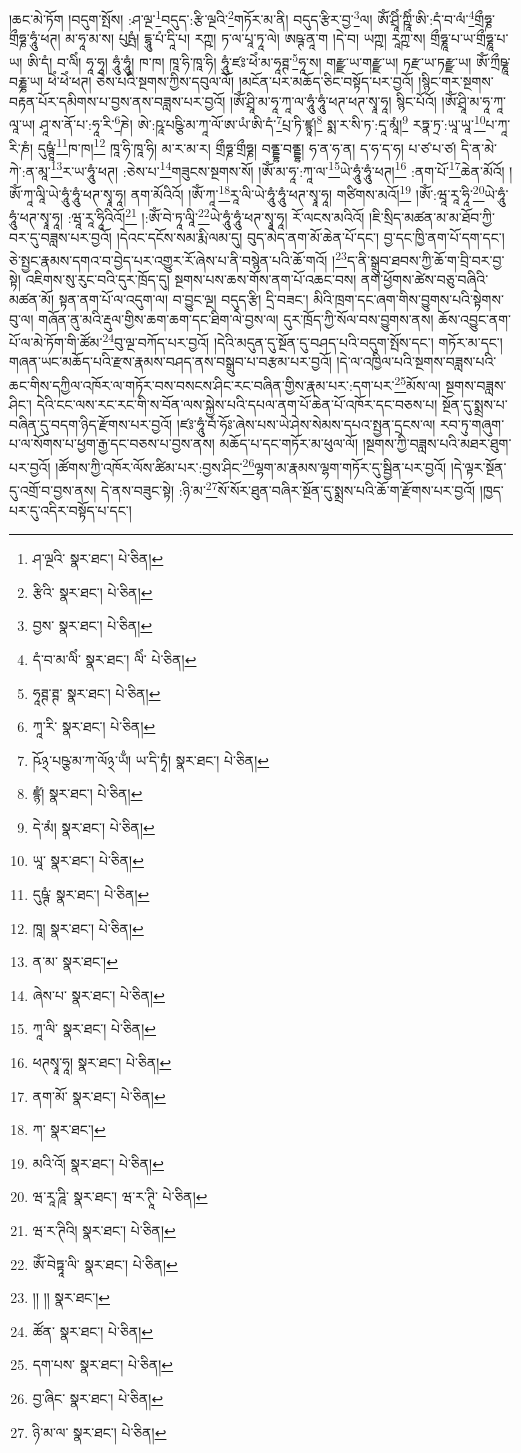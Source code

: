 །ཆང་མེ་ཏོག །བདུག་སྤོས། :ཤ་ལྔ་\footnote{ཤ་ལྔའི་  སྣར་ཐང་།  པེ་ཅིན། }བདུད་:རྩི་ལྔའི་\footnote{རྩིའི་  སྣར་ཐང་།  པེ་ཅིན། }གཏོར་མ་ནི། བདུད་རྩིར་བྱ་\footnote{བྱས་  སྣར་ཐང་།  པེ་ཅིན། }ལ། ཨོཾ་ཤྲཱིཾ་ཀྵཱིཾ་ཨི་:དཾ་བ་ལཾ་\footnote{དཾ་བ་མ་ལིཾ་  སྣར་ཐང་། ལིཾ་  པེ་ཅིན། }གྲྀཧྞ་གྲྀཧྞ་ཧཱུཾ་ཕཊ། མ་ཧཱ་མ་ས། པུཥྤཾ། དྷཱུ་པཾ་དཱི་པ། རཀྵ། ཏ་ལ་པཱ་ཏཱ་ལེ། ཨཥྚ་ནཱ་ག །དེ་བ། ཡཀྵ། རཱཀྵ་ས། གྲྀཧྞཱ་པ་ཡ་གྲྀཧྞཱ་པ་ཡ། ཨི་དཾ། བ་ལིཾ། ཧཱ་ཧཱ། ཧཱུཾ་ཧཱུཾ། ཁ་ཁ། ཁཱ་ཧི་ཁཱ་ཧི། ཧཱུཾ་ཛཿ་ཕེཾ་མ་ཧཱཊྚ་\footnote{ཧཱཊྚ་ཊྚ་  སྣར་ཐང་།  པེ་ཅིན། }ཧཱ་ས། གརྫྫ་ཡ་གརྫྫ་ཡ། ཏརྫ་ཡ་ཏརྫྫ་ཡ། ཨོཾ་ཀྲྀཥྞཱ་བརྞྞ་ཡ། ཕེཾ་ཕེཾ་ཕཊ། ཅེས་པའི་སྔགས་ཀྱིས་དབུལ་ལོ། །མངོན་པར་མཆོད་ཅིང་བསྟོད་པར་བྱའོ། །སྙིང་གར་སྔགས་བརྟན་པོར་དམིགས་པ་བྱས་ནས་བཟླས་པར་བྱའོ། །ཨོཾ་ཤྲཱི་མ་ཧཱ་ཀཱ་ལ་ཧཱུཾ་ཧཱུཾ་ཕཊ་ཕཊ་སྭཱ་ཧཱ། སྙིང་པོའོ། །ཨོཾ་ཤྲཱི་མ་ཧཱ་ཀཱ་ལཱ་ཡ། ཤཱ་ས་ནོ་པ་:ཧཱ་རི་\footnote{ཀཱ་རི་  སྣར་ཐང་།  པེ་ཅིན། }ཎེ། ཨེ་:ཥཱ་པཥྩི་མ་ཀཱ་ལོ་ཨ་ཡཾ་ཨི་དཾ་\footnote{ཥོ྅་པཥྩ་མ་ཀ་ལོ྅་ཡྃ། ཡ་དི་ཏྭཾ།   སྣར་ཐང་།  པེ་ཅིན། }པྲ་ཏི་ཛྙཱ།\footnote{ཛྙཾ།  སྣར་ཐང་།  པེ་ཅིན། } སྨ་ར་སི་ཏ་:དཱ་མཱཾ།\footnote{དེ་མཾ།  སྣར་ཐང་།  པེ་ཅིན། } རཏྣ་ཏྲ་:ཡཱ་ཡཱ་\footnote{ཡཱ་  སྣར་ཐང་།  པེ་ཅིན། }པ་ཀཱ་རི་ཎཾ། དུཥྚཱཾ་\footnote{དུཥྚཾ་  སྣར་ཐང་།  པེ་ཅིན། }ཁ་ཁ།\footnote{ཁཱ།  སྣར་ཐང་།  པེ་ཅིན། } ཁཱ་ཧི་ཁཱ་ཧི། མ་ར་མ་ར། གྲྀཧྞ་གྲྀཧྞ། བནྡྷ་བནྡྷ། ཧ་ན་ཧ་ན། ད་ཧ་ད་ཧ། པ་ཙ་པ་ཙ། དི་ན་མེ་ཀེ་:ན་མཱ་\footnote{ན་མ་  སྣར་ཐང་། }ར་ཡ་ཧཱུཾ་ཕཊ། :ཅེས་པ་\footnote{ཞེས་པ་  སྣར་ཐང་།  པེ་ཅིན། }གཟུངས་སྔགས་སོ། །ཨོཾ་མ་ཧཱ་:ཀཱ་ལ་\footnote{ཀཱ་ལི་  སྣར་ཐང་།  པེ་ཅིན། }ཡེ་ཧཱུཾ་ཧཱུཾ་ཕཊ།\footnote{ཕཊསྭཱ་ཧཱ།  སྣར་ཐང་།  པེ་ཅིན། } :ནག་པོ་\footnote{ནག་མོ་  སྣར་ཐང་།  པེ་ཅིན། }ཆེན་མོའོ། །ཨོཾ་ཀཱ་ལཱི་ཡེ་ཧཱུཾ་ཧཱུཾ་ཕཊ་སྭཱ་ཧཱ། ནག་མོའིའོ། །ཨོཾ་ཀཱ་\footnote{ཀ་  སྣར་ཐང་། }རཱ་ལི་ཡེ་ཧཱུཾ་ཧཱུཾ་ཕཊ་སྭཱ་ཧཱ། གཙིགས་མའོ།\footnote{མའི་འོ།  སྣར་ཐང་།  པེ་ཅིན། } །ཨོཾ་:ཝཱ་རཱ་ཧཱི་\footnote{ཝ་རཱ་ཌཱི་  སྣར་ཐང་། ཝ་ར་ཊཱི་  པེ་ཅིན། }ཡེ་ཧཱུཾ་ཧཱུཾ་ཕཊ་སྭཱ་ཧཱ། :ཝཱ་རཱ་ཧཱིའིའོ།\footnote{ཝ་ར་ཊིའི།  སྣར་ཐང་།  པེ་ཅིན། } །:ཨོཾ་བེ་ཏཱ་ལཱི་\footnote{ཨོཾ་བེཏྟཱ་ལི་  སྣར་ཐང་།  པེ་ཅིན། }ཡེ་ཧཱུཾ་ཧཱུཾ་ཕཊ་སྭཱ་ཧཱ། རོ་ལངས་མའིའོ། །ཇི་སྲིད་མཚན་མ་མ་ཐོབ་ཀྱི་བར་དུ་བཟླས་པར་བྱའོ། །དེའང་དངོས་སམ་རྨི་ལམ་དུ། བུད་མེད་ནག་མོ་ཆེན་པོ་དང་། བྱ་དང་ཁྱི་ནག་པོ་དག་དང་། ཅེ་སྤྱང་རྣམས་དགའ་བ་བྱེད་པར་འགྱུར་རོ་ཞེས་པ་ནི་བསྙེན་པའི་ཆོ་གའོ། །\footnote{།། །།  སྣར་ཐང་། }ད་ནི་སྒྲུབ་ཐབས་ཀྱི་ཆོ་ག་བྲི་བར་བྱ་སྟེ། འཇིགས་སུ་རུང་བའི་དུར་ཁྲོད་དུ། སྔགས་པས་ཆས་གོས་ནག་པོ་འཆང་བས། ནག་ཕྱོགས་ཚེས་བཅུ་བཞིའི་མཚན་མོ། སྟན་ནག་པོ་ལ་འདུག་ལ། བ་བྱུང་ལྔ། བདུད་རྩི། དྲི་བཟང་། མིའི་ཁྲག་དང་ཞག་གིས་བྱུགས་པའི་སྟེགས་བུ་ལ། གཞོན་ནུ་མའི་རྡུལ་གྱིས་ཆག་ཆག་དང་ཐིག་ལེ་བྱས་ལ། དུར་ཁྲོད་ཀྱི་སོལ་བས་བྱུགས་ནས། ཆོས་འབྱུང་ནག་པོ་ལ་མེ་ཏོག་གི་ཚོམ་\footnote{ཚོན་  སྣར་ཐང་།  པེ་ཅིན། }བུ་ལྔ་བཀོད་པར་བྱའོ། །དེའི་མདུན་དུ་སྔོན་དུ་བཤད་པའི་བདུག་སྤོས་དང་། གཏོར་མ་དང་། གཞན་ཡང་མཆོད་པའི་རྫས་རྣམས་བཤད་ནས་བསྒྲུབ་པ་བརྩམ་པར་བྱའོ། །དེ་ལ་འཁྱིལ་པའི་སྔགས་བཟླས་པའི་ཆང་གིས་དཀྱིལ་འཁོར་ལ་གཏོར་བས་བསངས་ཤིང་རང་བཞིན་གྱིས་རྣམ་པར་:དག་པར་\footnote{དག་པས་  སྣར་ཐང་།  པེ་ཅིན། }མོས་ལ། སྔགས་བཟླས་ཤིང་། དེའི་ངང་ལས་རང་རང་གི་ས་བོན་ལས་སྐྱེས་པའི་དཔལ་ནག་པོ་ཆེན་པོ་འཁོར་དང་བཅས་པ། སྔོན་དུ་སྨྲས་པ་བཞིན་དུ་བདག་ཉིད་རྫོགས་པར་བྱའོ། །ཛཿ་ཧཱུཾ་བཾ་ཧོཿ་ཞེས་པས་ཡེ་ཤེས་སེམས་དཔའ་སྤྱན་དྲངས་ལ། རབ་ཏུ་གཞུག་པ་ལ་སོགས་པ་ཕྱག་རྒྱ་དང་བཅས་པ་བྱས་ནས། མཆོད་པ་དང་གཏོར་མ་ཕུལ་ལོ། །སྔགས་ཀྱི་བཟླས་པའི་མཐར་ཐུག་པར་བྱའོ། །ཚོགས་ཀྱི་འཁོར་ལོས་ཚིམ་པར་:བྱས་ཤིང་\footnote{བྱ་ཞིང་  སྣར་ཐང་།  པེ་ཅིན། }ལྷག་མ་རྣམས་ལྷག་གཏོར་དུ་སྦྱིན་པར་བྱའོ། །དེ་ལྟར་སྔོན་དུ་འགྲོ་བ་བྱས་ནས། དེ་ནས་བཟུང་སྟེ། :ཉི་མ་\footnote{ཉི་མ་ལ་  སྣར་ཐང་།  པེ་ཅིན། }སོ་སོར་ཐུན་བཞིར་སྔོན་དུ་སྨྲས་པའི་ཆོ་ག་རྫོགས་པར་བྱའོ། །ཁྱད་པར་དུ་འདིར་བསྟོད་པ་དང་། 